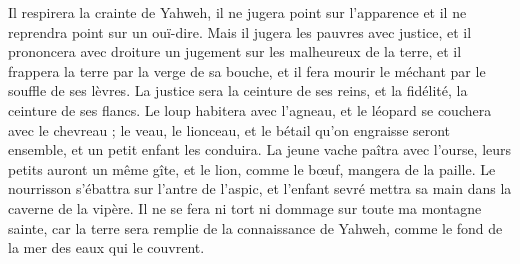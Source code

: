 \begin{multicols}{2}
Il respirera la crainte de Yahweh, il ne jugera point sur l'apparence et il ne reprendra point sur un ouï-dire.
Mais il jugera les pauvres avec justice, et il prononcera avec droiture un jugement sur les malheureux de la terre, et il frappera la terre par la verge de sa bouche, et il fera mourir le méchant par le souffle de ses lèvres.
La justice sera la ceinture de ses reins, et la fidélité, la ceinture de ses flancs.
Le loup habitera avec l'agneau, et le léopard se couchera avec le chevreau ; le veau, le lionceau, et le bétail qu'on engraisse seront ensemble, et un petit enfant les conduira.
La jeune vache paîtra avec l'ourse, leurs petits auront un même gîte, et le lion, comme le bœuf, mangera de la paille.
Le nourrisson s'ébattra sur l'antre de l'aspic, et l'enfant sevré mettra sa main dans la caverne de la vipère.
Il ne se fera ni tort ni dommage sur toute ma montagne sainte, car la terre sera remplie de la connaissance de Yahweh, comme le fond de la mer des eaux qui le couvrent.

\end{multicols}

